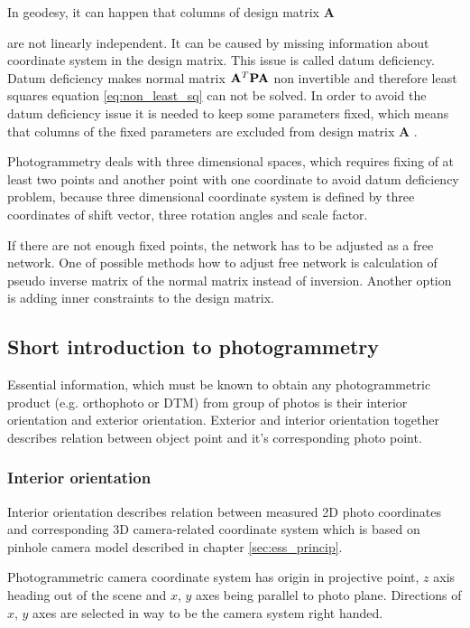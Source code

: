 \documentclass[a4paper,12pt]{article}
\newcommand{\ematr}[1]{
{\bf #1}
}
\begin{document}

In geodesy, it can happen that columns of design matrix \ematr{A}
are not linearly independent. It can be caused by missing information
about coordinate system in the design matrix. This issue is called datum deficiency.
Datum deficiency makes normal matrix $ \ematr{A}^{T} \ematr{P} \ematr{A}$ non invertible and therefore 
least squares equation \eqref{eq:non_least_sq} can not be solved.
In order to avoid the datum deficiency issue it is needed to keep some parameters fixed, 
which means that columns of the fixed parameters are excluded from design matrix\ematr{A}.

Photogrammetry deals with three dimensional spaces, which requires fixing of at least  
two points and another point with one coordinate to avoid datum deficiency problem, because
three dimensional coordinate system is defined by three coordinates of shift vector, three rotation angles and scale factor. 

If there are not enough fixed points, the network has to be adjusted as a free network.
One of possible methods how to adjust free network is calculation of pseudo inverse matrix of the normal matrix instead of
inversion. Another option is adding inner constraints to the design matrix.

\subsection{Short introduction to photogrammetry}

Essential information, which must be known to obtain any photogrammetric
 product (e.g. orthophoto or DTM) from group of photos is their interior orientation and exterior orientation.
Exterior and interior orientation together describes relation between object point and
it's corresponding photo point.

\subsubsection{Interior orientation}

Interior orientation describes relation between measured 2D photo coordinates 
and corresponding 3D camera-related coordinate system which is based on pinhole camera model described in chapter \ref{sec:ess_princip}.

Photogrammetric camera coordinate system has origin in projective point,
$z$ axis heading out of the scene  and $x$, $y$ axes being parallel to photo plane. Directions of 
$x$, $y$ axes are selected in way to be the camera system right handed.
\end{document}
